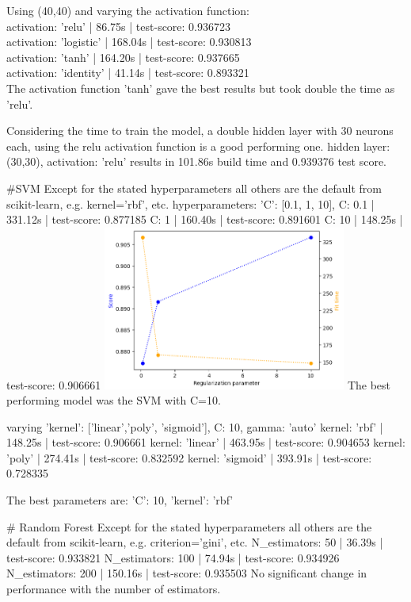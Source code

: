 \documentclass[12pt, letterpaper]{article}
\begin{document}
Using (40,40) and varying the activation function: \\
activation:  'relu' | 86.75s | test-score: 0.936723 \\ 
activation: 'logistic' | 168.04s | test-score: 0.930813 \\ 
activation: 'tanh' | 164.20s | test-score: 0.937665 \\ 
activation: 'identity' | 41.14s | test-score: 0.893321 \\ 
The activation function 'tanh' gave the best results but took double the time as 'relu'.

Considering the time to train the model, a double hidden layer with 30 neurons each, using the relu activation function is a good performing one.
hidden layer: (30,30), activation: 'relu' results in 101.86s build time and 0.939376 test score.

#SVM
Except for the stated hyperparameters all others are the default from scikit-learn, e.g. kernel='rbf', etc.
hyperparameters: 'C': [0.1, 1, 10],
C: 0.1 | 331.12s | test-score: 0.877185
C: 1 | 160.40s | test-score: 0.891601
C: 10 | 148.25s | test-score: 0.906661
\includegraphics[width=0.6\textwidth]{svm_c_compiled.png}
The best performing model was the SVM with C=10.

varying 'kernel': ['linear','poly', 'sigmoid'], C: 10, gamma: 'auto'
kernel: 'rbf' | 148.25s | test-score: 0.906661
kernel: 'linear' | 463.95s | test-score: 0.904653
kernel: 'poly' | 274.41s | test-score: 0.832592
kernel: 'sigmoid' | 393.91s | test-score: 0.728335

The best parameters are: {'C': 10, 'kernel': 'rbf'}

# Random Forest
Except for the stated hyperparameters all others are the default from scikit-learn, e.g. criterion='gini', etc.
N_estimators: 50 | 36.39s | test-score: 0.933821
N_estimators: 100 | 74.94s | test-score: 0.934926
N_estimators: 200 | 150.16s | test-score: 0.935503
No significant change in performance with the number of estimators.
\end{document}
